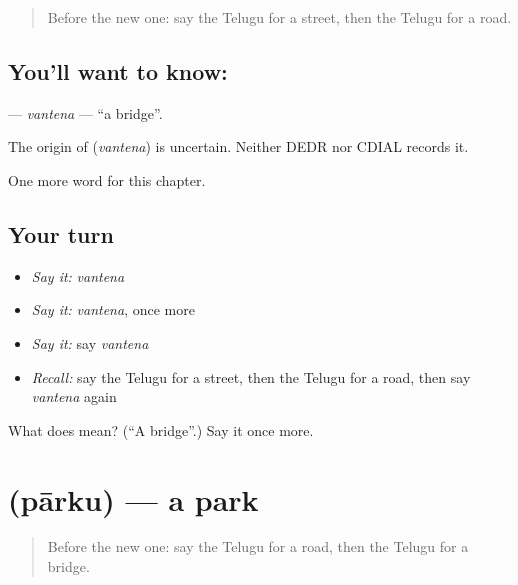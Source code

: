 \label{lesson:TE-C102-vantena}



\begin{quote}
Before the new one: say the Telugu for a street, then the Telugu for a road.
\end{quote}

\subsection*{You'll want to know: }
\textbf{} — \emph{vantena} — \textquotedblleft{}a bridge\textquotedblright{}.

\begin{cousinweb}
The origin of \textbf{} (\emph{vantena}) is uncertain. Neither DEDR nor CDIAL records it.
\end{cousinweb}

\begin{grammarlens}[title={What you've built}]
One more word for this chapter.
\end{grammarlens}

\subsection*{Your turn}
\begin{itemize}
\raggedright
  \item \emph{Say it:} \emph{vantena}
  \item \emph{Say it:} \emph{vantena}, once more
  \item \emph{Say it:} say \emph{vantena}
  \item \emph{Recall:} say the Telugu for a street, then the Telugu for a road, then say \emph{vantena} again
\end{itemize}

\begin{tcolorbox}[breakable,colback=teal!4,colframe=teal!35!black,title={Before you move on}]
What does  mean? (\textquotedblleft{}A bridge\textquotedblright{}.) Say it once more.
\end{tcolorbox}
\section[\texorpdfstring{\te{పార్కు} (pārku)}{పార్కు (pārku)}]{ (pārku) — a park}

\label{lesson:TE-C102-parku}



\begin{quote}
Before the new one: say the Telugu for a road, then the Telugu for a bridge.
\end{quote}

